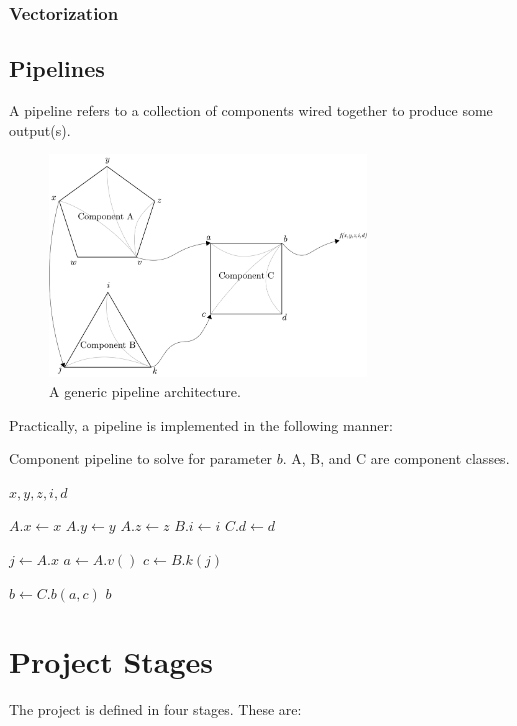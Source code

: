 \documentclass{article}
\begin{document}
\subsubsection{Vectorization}

\subsection{Pipelines}
A pipeline refers to a collection of components wired together to produce some output(s). 

\begin{figure}[H]
\centering
\includegraphics[width=0.75\textwidth]{figures/pipeline-architecture.png}
\caption{A generic pipeline architecture.}
\label{fig:pipeline-architecture}
\end{figure}

Practically, a pipeline is implemented in the following manner:

\begin{algorithm}
\caption{Component pipeline to solve for parameter $b$. A, B, and C are component classes.}\label{alg:pipeline}
\begin{algorithmic}

\Require $x, y, z, i, d$

\State $A.x \gets x$ 
\State $A.y \gets y$
\State $A.z \gets z$
\State $B.i \gets i$
\State $C.d \gets d$

\State $j \gets A.x$
\State $a \gets A.v()$
\State $c \gets B.k(j)$

\State $b \gets C.b(a, c)$
\State \Return $b$

\end{algorithmic}
\end{algorithm}

\section{Project Stages}
The project is defined in four stages. These are:
\end{document}
